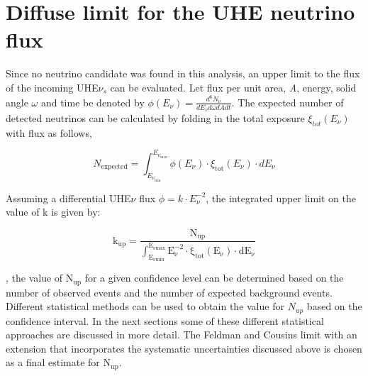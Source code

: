 \FloatBarrier
\section{Diffuse limit for the UHE neutrino flux}
\label{sec:diff_limit}
Since no neutrino candidate was found in this analysis, an upper limit to the flux of the incoming UHE$\nu_s$ can be evaluated. Let flux per unit area, \textit{A}, energy, solid angle $\omega$ and time be denoted by $\phi(E_{\nu}) = \frac{d^6 N_{\nu}}{dE_{\nu}d\omega dA dt}$. The expected number of detected neutrinos can be calculated by folding in the total exposure $\xi_{tot}(E_{\nu})$ with flux as follows,

\begin{equation}
  N_{\text{expected}} = \int_{E_{\nu_{\text{min}}}}^{E_{\nu_{\text{max}}}} \phi(E_{\nu}) \cdot \xi_{\text{tot}}(E_{\nu}) \cdot dE_{\nu}
\end{equation}

Assuming a differential UHE$\nu$ flux $\phi = k \cdot E_{\nu}^{-2}$, the integrated upper limit on the value of k is given by:

\begin{equation}
  \label{eq:integ_lim}
  \mathrm{k_{up} = \frac{N_{up}}{\int_{E_{\nu min}}^{E_{\nu max}} E_{\nu}^{-2} \cdot \xi_{tot}(E_{\nu}) \cdot dE_{\nu}}}
\end{equation}

, the value of $\mathrm{N_{up}}$ for a given confidence level can be determined based on the number of observed events and the number of expected background events. Different statistical methods can be used to obtain the value for $N_{up}$ based on the confidence interval. In the next sections some of these different statistical approaches are discussed in more detail. The Feldman and Cousins limit with an extension that incorporates the systematic uncertainties discussed above is chosen as a final estimate for $\mathrm{N_{up}}$.

